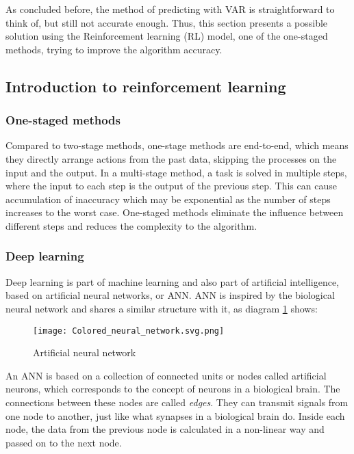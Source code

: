 \documentclass{mcmthesis}
\begin{document}
As concluded before,
the method of predicting with VAR is straightforward to think of,
but still not accurate enough.
Thus, this section presents a possible solution using the Reinforcement learning (RL) model, one of the one-staged methods,
trying to improve the algorithm accuracy.

\subsection{Introduction to reinforcement learning}

\subsubsection{One-staged methods}

Compared to two-stage methods, one-stage methods are end-to-end, which means they directly arrange actions from the past data, skipping the processes on the input and the output\cite{lecun2004autonomous}.
In a multi-stage method, a task is solved in multiple steps, where the input to each step is the output of the previous step.
This can cause accumulation of inaccuracy which may be exponential as the number of steps increases to the worst case.
One-staged methods eliminate the influence between different steps and reduces the complexity to the algorithm.

\subsubsection{Deep learning}

Deep learning is part of machine learning and also part of artificial intelligence,
based on artificial neural networks, or ANN.
ANN is inspired by the biological neural network
and shares a similar structure with it, as diagram \ref{ANN} shows:

\begin{figure}[h]
\small
\centering
\texttt{[image: Colored\_neural\_network.svg.png]}
\caption{Artificial neural network} \label{ANN}
\end{figure}

An ANN is based on a collection of connected units or nodes called artificial neurons,
which corresponds to the concept of neurons in a biological brain.
The connections between these nodes are called \textit{edges}.
They can transmit signals from one node to another,
just like what synapses in a biological brain do.
Inside each node, the data from the previous node is calculated in a non-linear way
and passed on to the next node.
\end{document}
